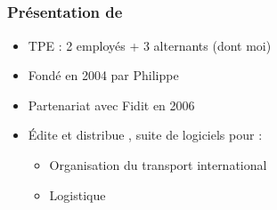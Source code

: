 \subsection{\solulog}

\begin{frame}
	\frametitle{Présentation de \solulog}

	\begin{itemize}
		\item TPE : 2 employés + 3 alternants (dont moi)\sautligne

		\item Fondé en 2004 par Philippe 
		\item Partenariat avec Fidit en 2006\sautligne

		\item \'Edite et distribue , suite de logiciels pour :
			\begin{itemize}
				\item Organisation du transport international
				\item Logistique
			\end{itemize}
	\end{itemize}
\end{frame}
